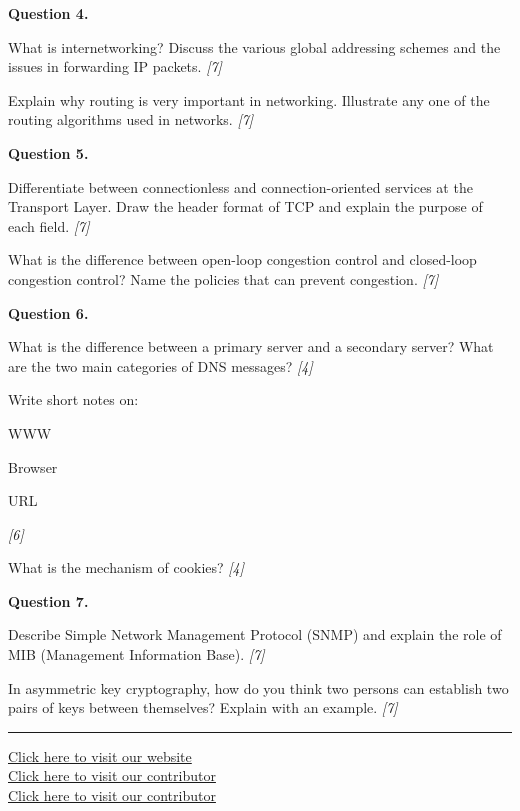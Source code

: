 \documentclass[11pt,a4paper]{article}
\newcommand{\pts}[1]{\hfill   \textit{[#1]}}
\begin{document}
\medskip


\noindent   \textbf{Question 4.}

\begin{parts}
  \item What is internetworking? Discuss the various global addressing schemes and the issues in forwarding IP packets. \pts{7}
  \item Explain why routing is very important in networking. Illustrate any one of the routing algorithms used in networks. \pts{7}
\end{parts}

\medskip


\noindent   \textbf{Question 5.}

\begin{parts}
  \item Differentiate between connectionless and connection-oriented services at the Transport Layer. Draw the header format of TCP and explain the purpose of each field. \pts{7}
  \item What is the difference between open-loop congestion control and closed-loop congestion control? Name the policies that can prevent congestion. \pts{7}
\end{parts}

\medskip


\noindent   \textbf{Question 6.}

\begin{parts}
  \item What is the difference between a primary server and a secondary server? What are the two main categories of DNS messages? \pts{4}
  \item Write short notes on:
  
\begin{parts}
    \item WWW
    \item Browser
    \item URL
  \end{parts} \pts{6}
  \item What is the mechanism of cookies? \pts{4}
\end{parts}

\medskip


\noindent   \textbf{Question 7.}

\begin{parts}
  \item Describe Simple Network Management Protocol (SNMP) and explain the role of MIB (Management Information Base). \pts{7}
  \item In asymmetric key cryptography, how do you think two persons can establish two pairs of keys between themselves? Explain with an example. \pts{7}
\end{parts}

\vfill
\rule{\linewidth}{0.4pt}

\begin{center}\small
\href{https://bhu-exam.vercel.app/}{Click here to visit our website}\\[4pt]\href{https://me-aryan.vercel.app/}{Click here to visit our contributor}\\[4pt]\href{https://quashan-me.vercel.app/}{Click here to visit our contributor}
\end{center}
\end{document}
